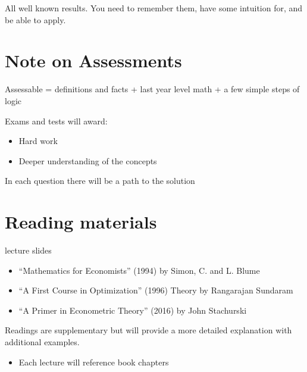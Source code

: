 \documentclass[letterpaper,10pt,english]{jupyterBook}
\begin{document}
\sphinxAtStartPar
All well known results. You need to remember them, have some intuition for, and be able to apply.


\chapter{Note on Assessments}
\label{\detokenize{01.introduction:note-on-assessments}}
\sphinxAtStartPar
Assessable = definitions and facts + last year level math + a few simple steps of logic

\sphinxAtStartPar
Exams and tests will award:
\begin{itemize}
\item {} 
\sphinxAtStartPar
Hard work

\item {} 
\sphinxAtStartPar
Deeper understanding of the concepts

\end{itemize}

\sphinxAtStartPar
In each question there will be a  path to the solution


\chapter{Reading materials}
\label{\detokenize{01.introduction:reading-materials}}
\sphinxAtStartPar
{} lecture slides

\sphinxAtStartPar
{}
\begin{itemize}
\item {} 
\sphinxAtStartPar
“Mathematics for Economists” (1994) by Simon, C. and L. Blume

\item {} 
\sphinxAtStartPar
“A First Course in Optimization” (1996) Theory by Rangarajan Sundaram

\item {} 
\sphinxAtStartPar
“A Primer in Econometric Theory” (2016) by John Stachurski

\end{itemize}

\sphinxAtStartPar
Readings are supplementary but will provide a more detailed explanation with additional examples.
\begin{itemize}
\item {} 
\sphinxAtStartPar
Each lecture will reference book chapters

\end{itemize}
\end{document}
